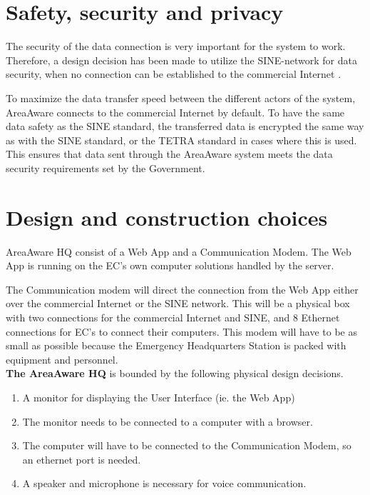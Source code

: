 \pagebreak

\section{Safety, security and privacy}
The security of the data connection is very important for the system to work. Therefore, a design decision has been made to utilize the SINE-network for data security, when no connection can be established to the commercial Internet \citep{SINE_artikel}. 

To maximize the data transfer speed between the different actors of the system, AreaAware connects to the commercial Internet by default. To have the same data safety as the SINE standard, the transferred data is encrypted the same way as with the SINE standard, or the TETRA standard in cases where this is used. This ensures that data sent through the AreaAware system meets the data security requirements set by the Government.

\section{Design and construction choices}
AreaAware HQ consist of a Web App and a Communication Modem. The Web App is running on the EC's own computer solutions handled by the server. 

The Communication modem will direct the connection from the Web App either over the commercial Internet or the SINE network. This will be a physical box with two connections for the commercial Internet and SINE, and 8 Ethernet connections for EC's to connect their computers. This modem will have to be as small as possible because the Emergency Headquarters Station is packed with equipment and personnel.\\

\noindent \textbf{The AreaAware HQ} is bounded by the following physical design decisions.
\begin{enumerate}[label=D-HQ\arabic*,leftmargin=1.4cm]
	\item A monitor for displaying the User Interface (ie. the Web App)
	\item The monitor needs to be connected to a computer with a browser.
	\item The computer will have to be connected to the Communication Modem, so an ethernet port is needed.
	\item A speaker and microphone is necessary for voice communication. \\
\end{enumerate}

